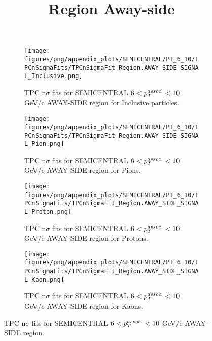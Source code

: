             \begin{figure}[H]
                \title{Region Away-side}
                \begin{subfigure}[b]{0.5\textwidth}
                    \centering
                    \texttt{[image: figures/png/appendix\_plots/SEMICENTRAL/PT\_6\_10/TPCnSigmaFits/TPCnSigmaFit\_Region.AWAY\_SIDE\_SIGNAL\_Inclusive.png]}
                    \caption{TPC n$\sigma$ fits for SEMICENTRAL $6 < \pTassoc < 10$ GeV/c AWAY-SIDE region for Inclusive particles.}
                    \label{fig:appendix_SEMICENTRAL_$6 < \pTassoc < 10$ GeV/c_AWAY_SIDE_SIGNAL_Inclusive}
                \end{subfigure}
                \begin{subfigure}[b]{0.5\textwidth}
                    \centering
                    \texttt{[image: figures/png/appendix\_plots/SEMICENTRAL/PT\_6\_10/TPCnSigmaFits/TPCnSigmaFit\_Region.AWAY\_SIDE\_SIGNAL\_Pion.png]}
                    \caption{TPC n$\sigma$ fits for SEMICENTRAL $6 < \pTassoc < 10$ GeV/c AWAY-SIDE region for Pions.}
                    \label{fig:appendix_SEMICENTRAL_$6 < \pTassoc < 10$ GeV/c_AWAY_SIDE_SIGNAL_Pion}
                \end{subfigure}
                \begin{subfigure}[b]{0.5\textwidth}
                    \centering
                    \texttt{[image: figures/png/appendix\_plots/SEMICENTRAL/PT\_6\_10/TPCnSigmaFits/TPCnSigmaFit\_Region.AWAY\_SIDE\_SIGNAL\_Proton.png]}
                    \caption{TPC n$\sigma$ fits for SEMICENTRAL $6 < \pTassoc < 10$ GeV/c AWAY-SIDE region for Protons.}
                    \label{fig:appendix_SEMICENTRAL_$6 < \pTassoc < 10$ GeV/c_AWAY_SIDE_SIGNAL_Proton}
                \end{subfigure}
                \begin{subfigure}[b]{0.5\textwidth}
                    \centering
                    \texttt{[image: figures/png/appendix\_plots/SEMICENTRAL/PT\_6\_10/TPCnSigmaFits/TPCnSigmaFit\_Region.AWAY\_SIDE\_SIGNAL\_Kaon.png]}
                    \caption{TPC n$\sigma$ fits for SEMICENTRAL $6 < \pTassoc < 10$ GeV/c AWAY-SIDE region for Kaons.}
                    \label{fig:appendix_SEMICENTRAL_$6 < \pTassoc < 10$ GeV/c_AWAY_SIDE_SIGNAL_Kaon}
                \end{subfigure}
                \caption{TPC n$\sigma$ fits for SEMICENTRAL $6 < \pTassoc < 10$ GeV/c AWAY-SIDE region.}
                \label{fig:appendix_SEMICENTRAL_$6 < \pTassoc < 10$ GeV/c_AWAY_SIDE_SIGNAL}
            \end{figure}
